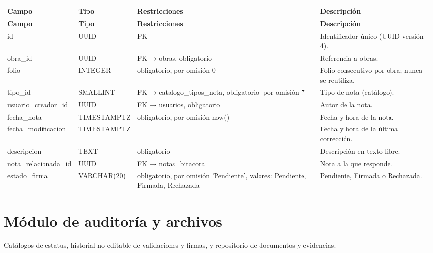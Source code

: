 \begin{xltabular}{\linewidth}{@{}>{\ttfamily\footnotesize}p{4.9cm}>{\ttfamily\footnotesize}p{2.4cm}>{\raggedright\arraybackslash\footnotesize}p{3.3cm}>{\footnotesize}X@{}}
\toprule\normalfont\sffamily\bfseries\footnotesize Campo & \normalfont\sffamily\bfseries\footnotesize Tipo & \sffamily\bfseries Restricciones & \sffamily\bfseries Descripción\\\midrule\endfirsthead
\toprule\normalfont\sffamily\bfseries\footnotesize Campo & \normalfont\sffamily\bfseries\footnotesize Tipo & \sffamily\bfseries Restricciones & \sffamily\bfseries Descripción\\\midrule\endhead
\bottomrule\endfoot
id & UUID & PK & Identificador único (UUID versión 4).\\
obra\_id & UUID & FK → obras, obligatorio & Referencia a obras.\\
folio & INTEGER & obligatorio, por omisión 0 & Folio consecutivo por obra; nunca se reutiliza.\\
tipo\_id & SMALLINT & FK → catalogo\_tipos\_nota, obligatorio, por omisión 7 & Tipo de nota (catálogo).\\
usuario\_creador\_id & UUID & FK → usuarios, obligatorio & Autor de la nota.\\
fecha\_nota & TIMESTAMPTZ & obligatorio, por omisión now() & Fecha y hora de la nota.\\
fecha\_modificacion & TIMESTAMPTZ &  & Fecha y hora de la última corrección.\\
descripcion & TEXT & obligatorio & Descripción en texto libre.\\
nota\_relacionada\_id & UUID & FK → notas\_bitacora & Nota a la que responde.\\
estado\_firma & VARCHAR(20) & obligatorio, por omisión 'Pendiente', valores: Pendiente, Firmada, Rechazada & Pendiente, Firmada o Rechazada.\\
\end{xltabular}

\section{Módulo de auditoría y archivos}
Catálogos de estatus, historial no editable de validaciones y firmas, y repositorio de documentos y evidencias.

